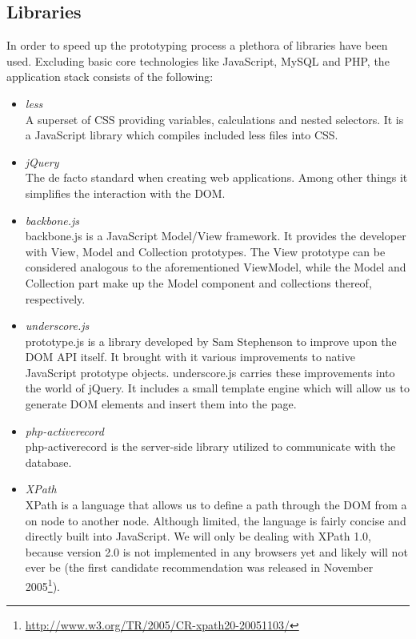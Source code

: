 \documentclass[thesis.tex]{subfiles}
\begin{document}
\subsection{Libraries}
In order to speed up the prototyping process a plethora of libraries have been
used. Excluding basic core technologies like JavaScript, MySQL and PHP, the
application stack consists of the following:
\begin{itemize}
	\item \emph{less}\\
		A superset of CSS providing variables, calculations and nested selectors. It
		is a JavaScript library which compiles included less files into CSS.
	\item \emph{jQuery}\\
		The de facto standard when creating web applications. Among other things it
		simplifies the interaction with the DOM.
	\item \emph{backbone.js}\label{sec:backbonejs}\\
		backbone.js is a JavaScript Model/View framework. It provides the developer
		with View, Model and Collection prototypes. The View prototype can be
		considered analogous to the aforementioned ViewModel, while the Model and
		Collection part make up the Model component and collections thereof,
		respectively.
	\item \emph{underscore.js}\\
		prototype.js is a library developed by Sam Stephenson to improve upon the
		DOM API itself.
		It brought with it various improvements to native JavaScript prototype
		objects.
		underscore.js carries these improvements into the world of jQuery.
		It includes a small template engine which will allow us to generate
		DOM elements and insert them into the page.
	\item \emph{php-activerecord}\\
		php-activerecord is the server-side library utilized to communicate with the
		database.
	\item \emph{XPath}\\
		XPath is a language that allows us to define a path through the DOM
		from a on node to another node.
		Although limited, the language is fairly concise and directly built into
		JavaScript. We will only be dealing with XPath 1.0, because version 2.0 is
		not implemented in any browsers yet and likely will not ever be
		(the first candidate recommendation was released in
		November 2005\footnote{\url{http://www.w3.org/TR/2005/CR-xpath20-20051103/}}).
\end{itemize}
\end{document}
